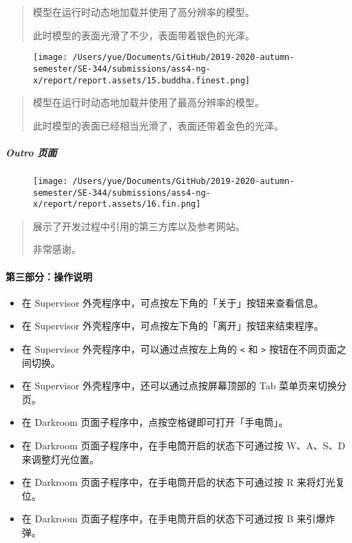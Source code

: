 \documentclass[
]{article}
\begin{document}
\begin{quote}
模型在运行时动态地加载并使用了高分辨率的模型。

此时模型的表面光滑了不少，表面带着银色的光泽。
\end{quote}

\begin{figure}
\centering
\texttt{[image: /Users/yue/Documents/GitHub/2019-2020-autumn-semester/SE-344/submissions/ass4-ng-x/report/report.assets/15.buddha.finest.png]}
\caption{}
\end{figure}

\begin{quote}
模型在运行时动态地加载并使用了最高分辨率的模型。

此时模型的表面已经相当光滑了，表面还带着金色的光泽。
\end{quote}

\hypertarget{header-n76}{%
\subparagraph{Outro 页面}\label{header-n76}}

\begin{figure}
\centering
\texttt{[image: /Users/yue/Documents/GitHub/2019-2020-autumn-semester/SE-344/submissions/ass4-ng-x/report/report.assets/16.fin.png]}
\caption{}
\end{figure}

\begin{quote}
展示了开发过程中引用的第三方库以及参考网站。

非常感谢。
\end{quote}

\hypertarget{header-n81}{%
\paragraph{第三部分：操作说明}\label{header-n81}}

\begin{itemize}
\item
  在 Supervisor 外壳程序中，可点按左下角的「关于」按钮来查看信息。
\item
  在 Supervisor 外壳程序中，可点按左下角的「离开」按钮来结束程序。
\item
  在 Supervisor 外壳程序中，可以通过点按左上角的 \texttt{\textless{}} 和
  \texttt{\textgreater{}} 按钮在不同页面之间切换。
\item
  在 Supervisor 外壳程序中，还可以通过点按屏幕顶部的 Tab
  菜单页来切换分页。
\item
  在 Darkroom 页面子程序中，点按空格键即可打开「手电筒」。
\item
  在 Darkroom 页面子程序中，在手电筒开启的状态下可通过按 W、A、S、D
  来调整灯光位置。
\item
  在 Darkroom 页面子程序中，在手电筒开启的状态下可通过按 R
  来将灯光复位。
\item
  在 Darkroom 页面子程序中，在手电筒开启的状态下可通过按 B 来引爆炸弹。
\end{itemize}
\end{document}

